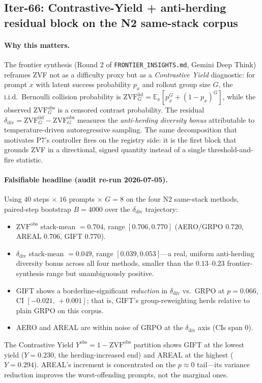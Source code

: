 \documentclass{article}
\begin{document}
\subsection{Iter-66: Contrastive-Yield + anti-herding residual block on the N2 same-stack corpus}
\label{sec:p6-zvf-antiherding}

\paragraph{Why this matters.}
The frontier synthesis (Round 2 of \texttt{FRONTIER\_INSIGHTS.md},
Gemini Deep Think) reframes ZVF not as a difficulty proxy but as a
\emph{Contrastive Yield} diagnostic:
for prompt $x$ with latent success probability $p_x$ and rollout
group size $G$, the i.i.d.\ Bernoulli collision probability is
$\mathrm{ZVF}^{\mathrm{iid}}_G = \mathbb{E}_x[p_x^G + (1-p_x)^G]$, while
the observed $\mathrm{ZVF}^{\mathrm{obs}}_G$ is a censored contrast
probability. The residual
$\delta_{\mathrm{div}} = \mathrm{ZVF}^{\mathrm{iid}}_G -
\mathrm{ZVF}^{\mathrm{obs}}_G$ measures the \emph{anti-herding diversity
bonus} attributable to temperature-driven autoregressive sampling. The
same decomposition that motivates P7's controller fires on the registry
side: it is the first block that grounds ZVF in a directional, signed
quantity instead of a single threshold-and-fire statistic.

\paragraph{Falsifiable headline (audit re-run 2026-07-05).}
Using $40$ steps $\times$ $16$ prompts $\times$ $G=8$ on the four
N2 same-stack methods, paired-step bootstrap $B=4000$ over the
$\delta_{\mathrm{div}}$ trajectory:
\begin{itemize}
  \item $\mathrm{ZVF}^{\mathrm{obs}}$ stack-mean $=0.704$, range
        $[0.706, 0.770]$ (AERO/GRPO $0.720$, AREAL $0.706$, GIFT $0.770$).
  \item $\delta_{\mathrm{div}}$ stack-mean $=\mathbf{0.049}$, range
        $[0.039, 0.053]$---a real, uniform anti-herding diversity bonus
        across all four methods, smaller than the $0.13$--$0.23$
        frontier-synthesis range but unambiguously positive.
  \item GIFT shows a borderline-significant \emph{reduction} in
        $\delta_{\mathrm{div}}$ vs.\ GRPO at $p=0.066$, CI
        $[-0.021,\,+0.001]$; that is, GIFT's group-reweighting herds
        relative to plain GRPO on this corpus.
  \item AERO and AREAL are within noise of GRPO at the
        $\delta_{\mathrm{div}}$ axis (CIs span $0$).
\end{itemize}
The Contrastive Yield $Y^{\mathrm{obs}} = 1 - \mathrm{ZVF}^{\mathrm{obs}}$
partition shows GIFT at the lowest yield ($Y=0.230$, the
herding-increased end) and AREAL at the highest ($Y=0.294$). AREAL's
increment is concentrated on the $p\approx 0$ tail---its variance
reduction improves the worst-offending prompts, not the marginal ones.
\end{document}
